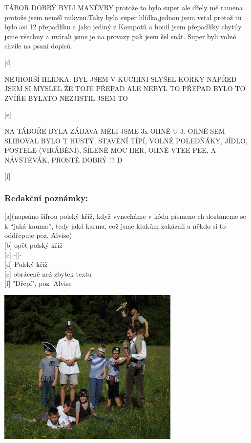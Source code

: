 \begin{multicols}{2}
TÁBOR
DOBRÝ BYLI MANÉVRY protože to bylo super ale dřely mě ramena protože jsem neměl mikynu.Taky byla super hlídka,jednou jsem vstal protož tu bylo asi 12 přepadlíku a jako jediný z Kompotů a honil jsem přepadlíky chytily jsme všechny a uvárali jsme je na provazy pak jsem šel snát. Super byli volné chvíle na psaní dopisů.


 [d]


NEJHORŠÍ HLÍDKA:
BYL JSEM V KUCHINI SLYŠEL KORKY NAPŘED JSEM SI MYSLEL ŽE TOJE PŘEPAD ALE NEBYL TO PŘEPAD BYLO TO ZVÍŘE BYLATO NEZJISTIL JSEM TO


 [e]

\columnbreak

NA TÁBOŘE BYLA ZÁBAVA MĚLI JSME 3x OHNĚ U 3. OHNĚ SEM SLIBOVAL BYLO T HUSTÝ. STAVĚNÍ TÍPÍ, VOLNÉ POLEDŇÁKY, JÍDLO, POSTELE (VIRÁBĚNÍ), ŠÍLENĚ MOC HER, OHNĚ VTEE PEE, A NÁVŠTĚVÁK, PROSTĚ DOBRÝ !!!
D

[f]\\ \vspace{5pt}


\subsubsection{Redakční poznámky:} %
\label{ssub:pozn}




{[a]}(napsáno šifrou polský kříž, když vynecháme v kódu písmeno ch dostaneme se k “jaká kauma”, tedy jaká karma, což jsme klukům zakázali a někdo si to oddřepuje poz. Alvise) \\
{[b]} opět polský kříž \\
{[c]} -||- \\
{[d]} Polský kříž \\
{[e]} obráceně než zbytek textu \\
{[f]} "Dřepí", poz. Alvise \\



\end{multicols}

\begin{center}
\includegraphics[width=9cm]{img/druziny/kompoti.JPG}
\end{center}

\clearpage
